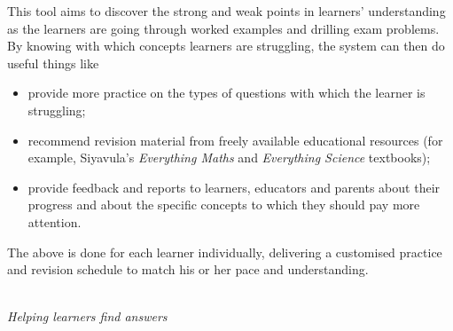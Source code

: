 {This tool aims to discover the strong and weak points in learners' understanding as the learners are going through worked examples and drilling exam problems. By knowing with which concepts learners are struggling, the system can then do useful things like
\begin{itemize}[noitemsep]
\item provide more practice on the types of questions with which the learner is struggling;
\item recommend revision material from freely available educational resources (for example,  Siyavula's \textit{Everything Maths} and \textit{Everything Science} textbooks);
\item provide feedback and reports to learners, educators and parents about their progress and about the specific concepts to which they should pay more attention.
\end{itemize}
 The above is done for each learner individually, delivering a customised practice and revision schedule to match his or her pace and understanding.\par






\vspace*{1cm}
}
\\
{\normalfont\sffamily\fontsize{22}\normalfont\itshape Helping learners find answers} \par

